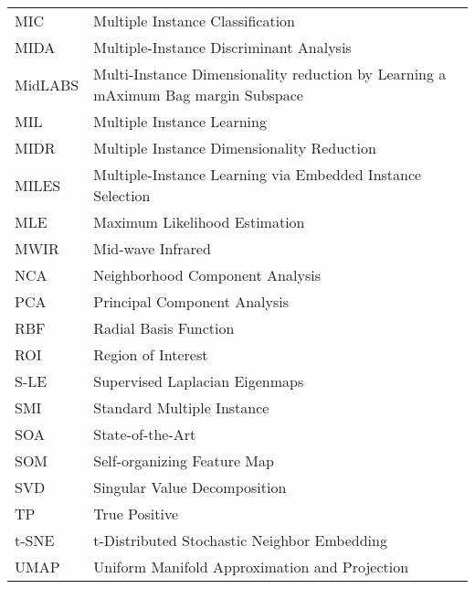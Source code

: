 \begin{tabular}{l p{5in}}
MIC & Multiple Instance Classification\\
MIDA & Multiple-Instance Discriminant Analysis\\
MidLABS & Multi-Instance Dimensionality reduction by Learning a mAximum Bag margin Subspace\\
MIL & Multiple Instance Learning\\
MIDR & Multiple Instance Dimensionality Reduction\\
MILES & Multiple-Instance Learning via Embedded Instance Selection\\
MLE & Maximum Likelihood Estimation\\
MWIR & Mid-wave Infrared\\
NCA & Neighborhood Component Analysis\\
PCA & Principal Component Analysis\\
RBF & Radial Basis Function\\
ROI & Region of Interest\\
S-LE & Supervised Laplacian Eigenmaps\\
SMI& Standard Multiple Instance\\
SOA & State-of-the-Art\\
SOM & Self-organizing Feature Map\\
SVD & Singular Value Decomposition\\
TP & True Positive\\
t-SNE & t-Distributed Stochastic Neighbor Embedding\\
UMAP & Uniform Manifold Approximation and Projection\\

 \end{tabular}



\doublespacing

